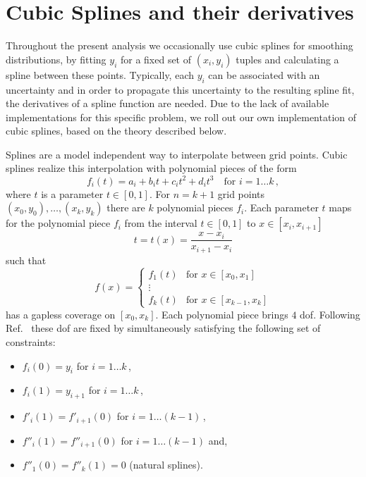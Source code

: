 \chapter{Cubic Splines and their derivatives}
\label{chap:csplines}
Throughout the present analysis we occasionally use cubic splines for smoothing distributions, by fitting $y_i$ for a fixed set of $(x_i, y_i)$ tuples and calculating a spline between these points.
Typically, each $y_i$ can be associated with an uncertainty and in order to propagate this uncertainty to the resulting spline fit, the derivatives of a spline function are needed.
Due to the lack of available implementations for this specific problem, we roll out our own implementation of cubic splines, based on the theory described below.

Splines are a model independent way to interpolate between grid points.
Cubic splines realize this interpolation with polynomial pieces of the form
\begin{equation*}
    f_i(t) = a_i + b_i t + c_i t^2 + d_i t^3 \quad \text{for } i=1 \ldots k \,,
\end{equation*}
where $t$ is a parameter $t \in [0,1]$.
For $n= k+1$ grid points $(x_0, y_0),\ldots,(x_k, y_k)$ there are $k$ polynomial pieces $f_i$.
Each parameter $t$ maps for the polynomial piece $f_i$ from the interval $t \in [0,1]$ to $x \in [x_i,x_{i+1}]$
\begin{equation*}
    t = t(x) = \frac{x-x_i}{x_{i+1}-x_i}
\end{equation*}
such that 
\begin{equation*}
    f(x) =
    \begin{cases}
        f_1(t) & \text{for }x \in [x_0,x_1] \\
        \vdots \\
        f_k(t) & \text{for }x \in [x_{k-1},x_k]
    \end{cases}
\end{equation*}
has a gapless coverage on $[x_0,x_k]$.
Each polynomial piece brings $4$ \gls{dof}.
Following Ref.~\cite{splines} these \gls{dof} are fixed by simultaneously satisfying the following set of constraints:
\begin{itemize}[itemsep=2pt,parsep=2pt]
    \item $f_i(0) = y_i$ for $i=1 \ldots k\,$,
    \item $f_i(1) = y_{i+1}$ for $i=1 \ldots k\,$,
    \item $f'_i(1) = f'_{i+1}(0)$ for $i=1 \ldots (k-1)\,$,
    \item $f''_i(1) = f''_{i+1}(0)$ for $i=1 \ldots (k-1)$ and,
    \item $f''_1(0) = f''_k(1) = 0$ (natural splines).
\end{itemize}
